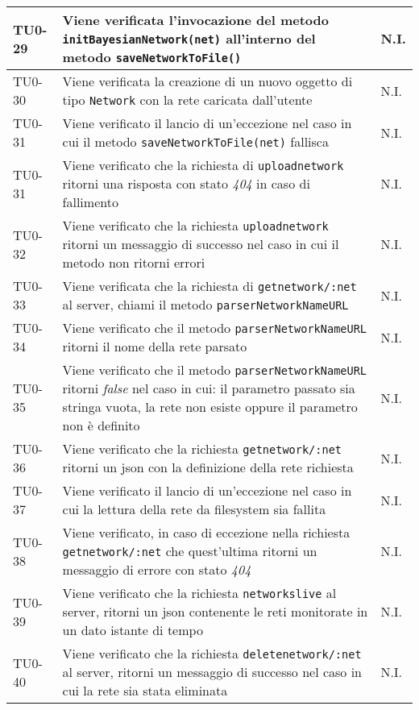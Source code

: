 \begin{longtable}{|C{.15\textwidth}|m{.66\textwidth}|C{.10\textwidth}|}
\hline 
{}TU0-29 & Viene verificata l'invocazione del metodo \texttt{initBayesianNetwork(net)} all'interno del metodo \texttt{saveNetworkToFile()} & N.I. \\ 
\hline 
TU0-30 & Viene verificata la creazione di un nuovo oggetto di tipo \texttt{Network} con la rete caricata dall'utente & N.I. \\ 
\hline
{} TU0-31 & Viene verificato il lancio di un'eccezione nel caso in cui il metodo \texttt{saveNetworkToFile(net)} fallisca & N.I. \\
\hline
TU0-31 & Viene verificato che la richiesta di \texttt{uploadnetwork} ritorni una risposta con stato \textit{404} in caso di fallimento & N.I. \\ 
\hline
{} TU0-32 & Viene verificato che la richiesta \texttt{uploadnetwork} ritorni un messaggio di successo nel caso in cui il metodo non ritorni errori & N.I. \\
\hline
TU0-33 & Viene verificata che la richiesta di \texttt{getnetwork/:net} al server, chiami il metodo \texttt{parserNetworkNameURL} & N.I. \\ 
\hline
{} TU0-34 & Viene verificato che il metodo \texttt{parserNetworkNameURL} ritorni il nome della rete parsato & N.I. \\ 
\hline 
TU0-35 & Viene verificato che il metodo \texttt{parserNetworkNameURL} ritorni \textit{false} nel caso in cui: il parametro passato sia stringa vuota, la rete non esiste oppure il parametro non è definito & N.I. \\ 
\hline 
{}TU0-36 & Viene verificato che la richiesta \texttt{getnetwork/:net} ritorni un json con la definizione della rete richiesta & N.I. \\ 
\hline 
TU0-37 & Viene verificato il lancio di un'eccezione nel caso in cui la lettura della rete da filesystem sia fallita & N.I. \\
\hline
  TU0-38 & Viene verificato, in caso di eccezione nella richiesta \texttt{getnetwork/:net} che quest'ultima ritorni un messaggio di errore con stato \textit{404} & N.I. \\ 
 \hline
 TU0-39 & Viene verificato che la richiesta \texttt{networkslive} al server, ritorni un json contenente le reti monitorate in un dato istante di tempo & N.I. \\ 
 \hline 
 TU0-40 & Viene verificato che la richiesta \texttt{deletenetwork/:net} al server, ritorni un messaggio di successo nel caso in cui la rete sia stata eliminata & N.I. \\

\end{longtable}
